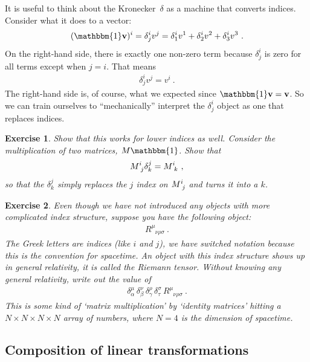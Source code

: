 \documentclass[12pt]{article}
\newtheorem{exercise}{Exercise}[section]
\begin{document}
It is useful to think about the Kronecker~$\delta$ as a machine that converts indices. Consider what it does to a vector:
\begin{align}
    (\mathbbm{1}\vec{v})^i = \delta^i_j v^j = 
    \delta^i_1v^1 + \delta^i_2v^2 + \delta^i_3v^3 \ .
\end{align}
On the right-hand side, there is exactly one non-zero term because $\delta^i_j$ is zero for all terms except when $j=i$. That means 
\begin{align}
    \delta^i_j v^j = v^i \ .
\end{align}
The right-hand side is, of course, what we expected since $\mathbbm{1}\vec{v} = \vec{v}$. So we can train ourselves to ``mechanically'' interpret the $\delta^i_j$ object as one that replaces indices. 
\begin{exercise}
Show that this works for lower indices as well. Consider the multiplication of two matrices, $M\mathbbm{1}$. Show that
\begin{align}
    M\aij{i}{j}\delta^j_k = M\aij{i}{k} \ ,
\end{align}
so that the $\delta^j_k$ simply replaces the $j$ index on $M\aij{i}{j}$ and turns it into a $k$.
\end{exercise}
\begin{exercise}
Even though we have not introduced any objects with more complicated index structure, suppose you have the following object: 
\begin{align}
    R^\mu_{\phantom{\mu}\nu\rho\sigma} \ .
\end{align}
The Greek letters are indices (like $i$ and $j$), we have switched notation because this is the convention for spacetime. An object with this index structure shows up in general relativity, it is called the Riemann tensor. Without knowing any general relativity, write out the value of
\begin{align}
    \delta^\mu_\alpha\,
    \delta^\nu_\beta\,
    \delta^\rho_\gamma\,
    \delta^\sigma_\tau\,
    R^\mu_{\phantom{\mu}\nu\rho\sigma} \ .
\end{align}
This is some kind of `matrix multiplication' by `identity matrices' hitting a $N\times N\times N\times N$ array of numbers, where $N=4$ is the dimension of spacetime. 
\end{exercise}

\subsection{Composition of linear transformations}
\end{document}
